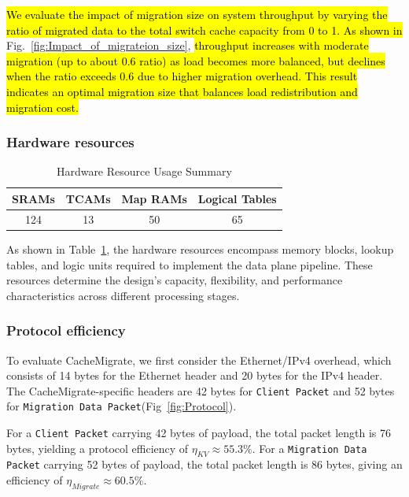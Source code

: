 \documentclass[conference]{IEEEtran}
\DeclareRobustCommand{\hlAdmin}[1]{{\sethlcolor{white}\hl{#1}}}%
\begin{document}
\hlAdmin{We evaluate the impact of migration size on system throughput by varying the ratio of migrated data to the total switch cache capacity from 0 to 1. As shown in} Fig.~\ref{fig:Impact_of_migrateion_size}, \hlAdmin{throughput increases with moderate migration (up to about 0.6 ratio) as load becomes more balanced, but declines when the ratio exceeds 0.6 due to higher migration overhead. This result indicates an optimal migration size that balances load redistribution and migration cost.}

\subsubsection{Hardware resources}
\begin{table}[htbp]
    \caption{Hardware Resource Usage Summary}
    \begin{center}
        \begin{tabular}{cccc}
            \hline
            \textbf{SRAMs} & \textbf{TCAMs} & \textbf{Map RAMs} & \textbf{Logical Tables} \\
            \hline
            124            & 13             & 50                & 65                      \\
            \hline
        \end{tabular}
        \label{tab:resource_summary}
    \end{center}
\end{table}

As shown in Table~\ref{tab:resource_summary}, the hardware resources encompass memory blocks, lookup tables, and logic units required to implement the data plane pipeline. These resources determine the design's capacity, flexibility, and performance characteristics across different processing stages.

\subsubsection{Protocol efficiency}

To evaluate CacheMigrate, we first consider the Ethernet/IPv4 overhead, which consists of 14 bytes for the Ethernet header and 20 bytes for the IPv4 header. The CacheMigrate-specific headers are 42 bytes for \texttt{Client Packet} and 52 bytes for \texttt{Migration Data Packet}(Fig~\ref{fig:Protocol}).

For a \texttt{Client Packet} carrying 42 bytes of payload, the total packet length is 76 bytes, yielding a protocol efficiency of $\eta_{KV} \approx 55.3\%$. For a \texttt{Migration Data Packet} carrying 52 bytes of payload, the total packet length is 86 bytes, giving an efficiency of $\eta_{Migrate} \approx 60.5\%$.
\end{document}
